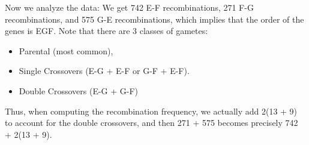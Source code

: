 Now we analyze the data: We get 742 E-F recombinations, 271 F-G recombinations, and 575 G-E recombinations, which implies that the order of the genes is EGF.
Note that there are 3 classes of gametes:
\begin{itemize}
	\item Parental (most common),
	\item Single Crossovers (E-G + E-F or G-F + E-F).
	\item Double Crossovers (E-G + G-F)
\end{itemize}
Thus, when computing the recombination frequency, we actually add 2(13 + 9) to account for the double crossovers, and then 271 + 575 becomes precisely 742 + 2(13 + 9).
